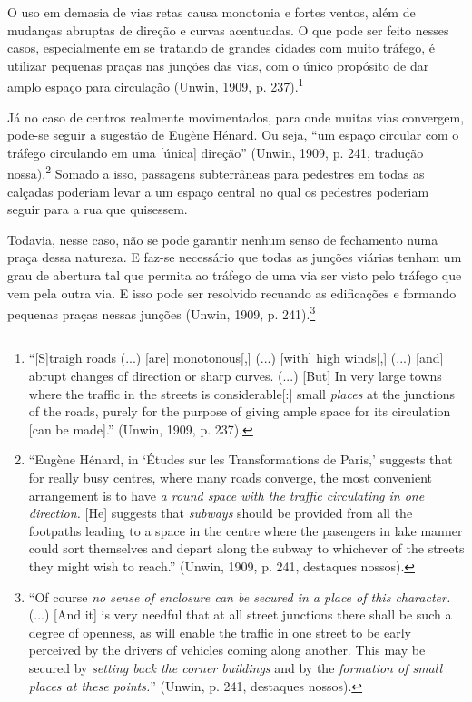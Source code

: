 \documentclass[12pt, a4paper]{book} %
\begin{document}
        O uso em demasia de vias retas causa monotonia e fortes ventos, além de mudanças abruptas de direção e curvas acentuadas. O que pode ser feito nesses casos, especialmente em se tratando de grandes cidades com muito tráfego, é utilizar pequenas praças nas junções das vias, com o único propósito de dar amplo espaço para circulação (Unwin, 1909, p. 237).\footnote[74]{``[S]traigh roads (...) [are] monotonous[,] (...) [with] high winds[,] (...) [and] abrupt changes of direction or sharp curves. (...) [But] In very large towns where the traffic in the streets is considerable[:] small \textit{places} at the junctions of the roads, purely for the purpose of giving ample space for its circulation [can be made].'' (Unwin, 1909, p. 237).}

        Já no caso de centros realmente movimentados, para onde muitas vias convergem, pode-se seguir a sugestão de Eugène Hénard. Ou seja, ``um espaço circular com o tráfego circulando em uma [única] direção'' (Unwin, 1909, p. 241, tradução nossa).\footnote[75]{``Eugène Hénard, in `Études sur les Transformations de Paris,' suggests that for really busy centres, where many roads converge, the most convenient arrangement is to have \textit{a round space with the traffic circulating in one direction.} [He] suggests that \textit{subways} should be provided from all the footpaths leading to a space in the centre where the pasengers in lake manner could sort themselves and depart along the subway to whichever of the streets they might wish to reach.'' (Unwin, 1909, p. 241, destaques nossos).} Somado a isso, passagens subterrâneas para pedestres em todas as calçadas poderiam levar a um espaço central no qual os pedestres poderiam seguir para a rua que quisessem.

        Todavia, nesse caso, não se pode garantir nenhum senso de fechamento numa praça dessa natureza. E faz-se necessário que todas as junções viárias tenham um grau de abertura tal que permita ao tráfego de uma via ser visto pelo tráfego que vem pela outra via. E isso pode ser resolvido recuando as edificações e formando pequenas praças nessas junções (Unwin, 1909, p. 241).\footnote[76]{``Of course \textit{no sense of enclosure can be secured in a \textit{place} of this character.} (...) [And it] is very needful that at all street junctions there shall be such a degree of openness, as will enable the traffic in one street to be early perceived by the drivers of vehicles coming along another. This may be secured by \textit{setting back the corner buildings} and by the \textit{formation of small places at these points.}'' (Unwin, p. 241, destaques nossos).}
\end{document}
